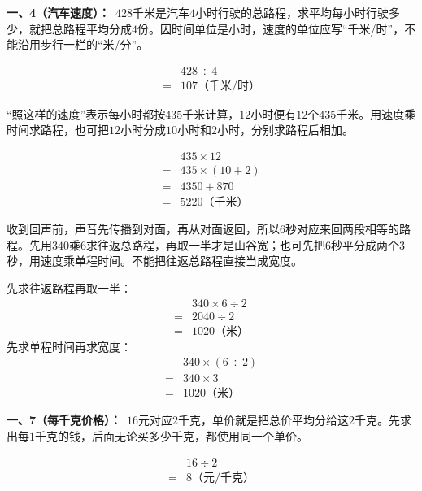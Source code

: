 \documentclass[multi=snippet,border=0pt]{standalone}
\newenvironment{snippet}[3]{\begin{minipage}{#1bp}\color{answerred}\fontsize{#2}{#3}\selectfont\raggedright}{\end{minipage}}
\begin{document}
\begin{snippet}{505}{11.5}{14}\textbf{一、4（汽车速度）：}\ \(428\)千米是汽车\(4\)小时行驶的总路程，求平均每小时行驶多少，就把总路程平均分成\(4\)份。因时间单位是小时，速度的单位应写“千米/时”，不能沿用步行一栏的“米/分”。\par \[\begin{aligned}&428\div4\\={}&107\text{（千米/时）}\end{aligned}\]\end{snippet}
\begin{snippet}{505}{11.5}{14}“照这样的速度”表示每小时都按\(435\)千米计算，\(12\)小时便有\(12\)个\(435\)千米。用速度乘时间求路程，也可把\(12\)小时分成\(10\)小时和\(2\)小时，分别求路程后相加。\par \[\begin{aligned}&435\times12\\={}&435\times(10+2)\\={}&4350+870\\={}&5220\text{（千米）}\end{aligned}\]\end{snippet}
\begin{snippet}{505}{11.5}{14}收到回声前，声音先传播到对面，再从对面返回，所以\(6\)秒对应来回两段相等的路程。先用\(340\)乘\(6\)求往返总路程，再取一半才是山谷宽；也可先把\(6\)秒平分成两个\(3\)秒，用速度乘单程时间。不能把往返总路程直接当成宽度。\par 先求往返路程再取一半：\[\begin{aligned}&340\times6\div2\\={}&2040\div2\\={}&1020\text{（米）}\end{aligned}\]先求单程时间再求宽度：\[\begin{aligned}&340\times(6\div2)\\={}&340\times3\\={}&1020\text{（米）}\end{aligned}\]\end{snippet}
\begin{snippet}{505}{11.5}{14}\textbf{一、7（每千克价格）：}\ \(16\)元对应\(2\)千克，单价就是把总价平均分给这\(2\)千克。先求出每\(1\)千克的钱，后面无论买多少千克，都使用同一个单价。\par \[\begin{aligned}&16\div2\\={}&8\text{（元/千克）}\end{aligned}\]\end{snippet}
\end{document}

